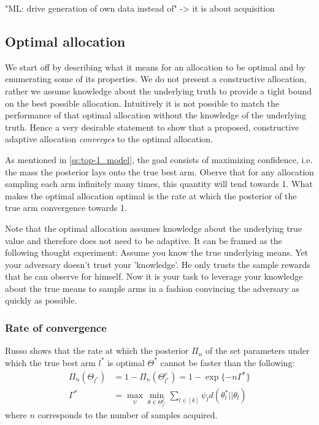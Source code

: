 "ML: drive generation of own data instead of" -> it is about acquisition

\subsection{Optimal allocation}\label{subsection:optimal_allocation}

We start off by describing what it means for an allocation to be optimal and by enumerating some of its properties. We do not present a constructive allocation, rather we assume knowledge about the underlying truth to provide a tight bound on the best possible allocation. Intuitively it is not possible to match the performance of that optimal allocation without the knowledge of the underlying truth. Hence a very desirable statement to show that a proposed, constructive adaptive allocation \emph{converges} to the optimal allocation.

As mentioned in \ref{ss:top-1_model}, the goal consists of maximizing confidence, i.e. the mass the posterior lays onto the true best arm. Oberve that for any allocation sampling each arm infinitely many times, this quantity will tend towards 1. What makes the optimal allocation optimal is the rate at which the posterior of the true arm convergence towards 1.

Note that the optimal allocation assumes knowledge about the underlying true value and therefore does not need to be adaptive. It can be framed as the following thought experiment: Assume you know the true underlying means. Yet your adversary doesn't trust your 'knowledge'. He only trusts the sample rewards that he can observe for himself. Now it is your task to leverage your knowledge about the true means to sample arms in a fashion convincing the adversary as quickly as possible.

\subsubsection{Rate of convergence}
Russo \cite{DBLP:journals/corr/Russo16} shows that the rate at which the posterior $\Pi_n$ of the set parameters under which the true best arm $l^*$ is optimal $\Theta^*$ cannot be faster than the following:
\begin{align}
  \Pi_n(\Theta_{l^*}) &= 1 - \Pi_n(\Theta^c_{l^*}) = 1 - \exp\{-n\Gamma^*\} \\
  \Gamma^* &= \max_{\psi} \min_{\theta \in \Theta^c_{l^*}} \sum_{l \in [k]} \psi_l d(\theta_l^* || \theta_l)
\end{align}
where $n$ corresponds to the number of samples acquired.

